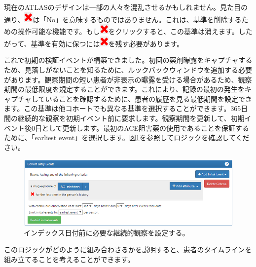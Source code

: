 \documentclass[
  11pt]{book}
\makeatletter
\newenvironment{kframe}{%
\medskip{}
\setlength{\fboxsep}{.8em}
 \def\at@end@of@kframe{}%
 \ifinner\ifhmode%
  \def\at@end@of@kframe{\end{minipage}}%
  \begin{minipage}{\columnwidth}%
 \fi\fi%
 \def\FrameCommand##1{\hskip\@totalleftmargin \hskip-\fboxsep
 \colorbox{myShadeColor}{##1}\hskip-\fboxsep
     \hskip-\linewidth \hskip-\@totalleftmargin \hskip\columnwidth}%
 \MakeFramed {\advance\hsize-\width
   \@totalleftmargin\z@ \linewidth\hsize
   \@setminipage}}%
 {\par\unskip\endMakeFramed%
 \at@end@of@kframe}
\newenvironment{rmdblock}[1]
  {
  \begin{itemize}
  \renewcommand{\labelitemi}{
    \raisebox{-.7\height}[0pt][0pt]{
      {\setkeys{Gin}{width=3em,keepaspectratio}\texttt{[image: images/\#1]}}
    }
  }
  \setlength{\fboxsep}{1em}
  \begin{kframe}
  \item
  }
  {
  \end{kframe}
  \end{itemize}
  }
\newenvironment{rmdimportant}
  {\begin{rmdblock}{important}}
  {\end{rmdblock}}
\theoremstyle{definition}
\theoremstyle{definition}
\theoremstyle{definition}
\theoremstyle{definition}
\theoremstyle{remark}
\makeatother
\begin{document}
\begin{rmdimportant}
現在のATLASのデザインは一部の人々を混乱させるかもしれません。見た目の通り、\includegraphics{images/Cohorts/redX.png}は「No」を意味するものではありません。これは、基準を削除するための操作可能な機能です。もし\includegraphics{images/Cohorts/redX.png}をクリックすると、この基準は消えます。したがって、基準を有効に保つには\includegraphics{images/Cohorts/redX.png}を残す必要があります。
\end{rmdimportant}

これで初期の検証イベントが構築できました。初回の薬剤曝露をキャプチャするため、見落しがないことを知るために、ルックバックウィンドウを追加する必要があります。観察期間の短い患者が非表示の曝露を受ける場合があるため、観察期間の最低限度を規定することができます。これにより、記録の最初の発生をキャプチャしていることを確認するために、患者の履歴を見る最低期間を設定できます。この基準は他コホートでも異なる基準を選択することができます。365日間の継続的な観察を初期イベント前に要求します。観察期間を更新して、初期イベント後0日として更新します。最初のACE阻害薬の使用であることを保証するために、「earliest event」を選択します。図\ref{fig:initialEventAce}を参照してロジックを確認してください。

\begin{figure}

{\centering \includegraphics[width=1\linewidth]{images/Cohorts/initialEventAce} 

}

\caption{インデックス日付前に必要な継続的観察を設定する。}\label{fig:initialEventAce}
\end{figure}

このロジックがどのように組み合わさるかを説明すると、患者のタイムラインを組み立てることを考えることができます。
\end{document}
